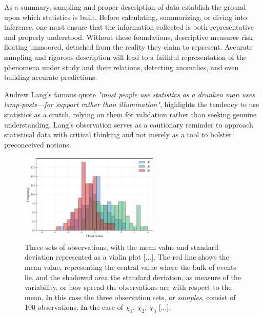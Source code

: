 \documentclass{book}
\begin{document}
\medskip

As a summary, sampling and proper description of data establish the ground upon which statistics is built. Before calculating, summarizing, or diving into inference, one must ensure that the information collected is both representative and properly understood. Without these foundations, descriptive measures risk floating unmoored, detached from the reality they claim to represent. Accurate sampling and rigorous description will lead to a faithful representation of the phenomena under study and their relations, detecting anomalies, and even building accurate predictions.

\medskip

Andrew Lang's famous quote \textit{"most people use statistics as a drunken man uses lamp-posts—for support rather than illumination"}, highlights the tendency to use statistics as a crutch, relying on them for validation rather than seeking genuine understanding. Lang's observation serves as a cautionary reminder to approach statistical data with critical thinking and not merely as a tool to bolster preconceived notions.

\begin{figure}[ht]
    \centering
    \includegraphics[width=0.6\textwidth]{figures/chapter1/mean_std_hist.png}
    \caption{Three sets of observations, with the mean value and standard deviation represented as a violin plot [...]. The red line shows the mean value, representing the central value where the bulk of events lie, and the shadowed area the standard deviation, as measure of the variability, or how spread the observations are with respect to the mean. In this case the three observation sets, or \textit{samples}, consist of 100 observations. In the case of $\chi_1$, $\chi_2$, $\chi_3$ [...].}
    \label{fig:histogram1}
\end{figure}
\end{document}
